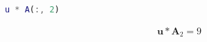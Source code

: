\begin{lstlisting}[language=Matlab]
u * A(:, 2)
\end{lstlisting}

\begin{solution}
\begin{align*}
    \boldsymbol{u} * \boldsymbol{A}_2 = 9
\end{align*}
\end{solution}